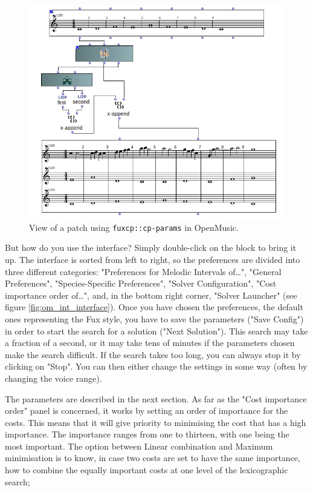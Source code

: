 \begin{figure}[h]
    \centering
    \includegraphics[width=5.2in]{Images/om_ext_interface_mod.png}
    \caption{View of a patch using \texttt{fuxcp::cp-params} in OpenMusic.}
    \label{fig:om_ext_interface_mod}
\end{figure}

But how do you use the interface? Simply double-click on the block to bring it up. The interface is sorted from left to right, so the preferences are divided into three different categories: "Preferences for Melodic Intervals of\dots", "General Preferences", "Species-Specific Preferences", "Solver Configuration", "Cost importance order of\dots", and, in the bottom right corner, "Solver Launcher" (see figure \ref{fig:om_int_interface}). Once you have chosen the preferences, the default ones representing the Fux style, you have to save the parameters ("Save Config") in order to start the search for a solution ("Next Solution"). This search may take a fraction of a second, or it may take tens of minutes if the parameters chosen make the search difficult. If the search takes too long, you can always stop it by clicking on "Stop". You can then either change the settings in some way (often by changing the voice range).

The parameters are described in the next section. As far as the "Cost importance order" panel is concerned, it works by setting an order of importance for the costs. This means that it will give priority to minimising the cost that has a high importance. The importance ranges from one to thirteen, with one being the most important. The option between Linear combination and Maximum minimisation is to know, in case two costs are set to have the same importance, how to combine the equally important costs at one level of the lexicographic search;

